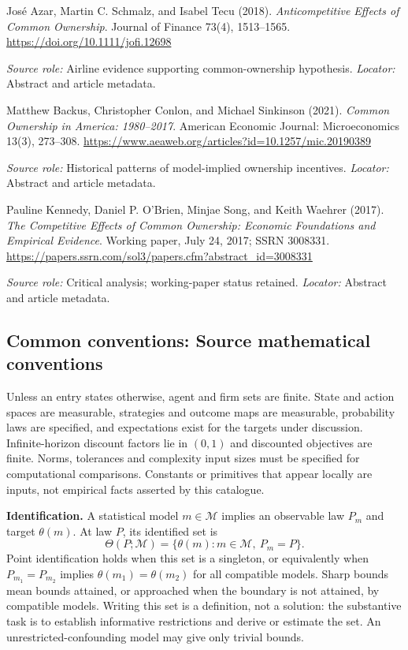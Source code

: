\documentclass[11pt,a4paper]{article}
\begin{document}
\begin{enumerate}[label={[S\arabic*]},leftmargin=*]

\item José Azar, Martin C. Schmalz, and Isabel Tecu (2018). \emph{Anticompetitive Effects of Common Ownership}. Journal of Finance 73(4), 1513--1565. \url{https://doi.org/10.1111/jofi.12698}\par \textit{Source role:} Airline evidence supporting common-ownership hypothesis. \textit{Locator:} Abstract and article metadata.

\item Matthew Backus, Christopher Conlon, and Michael Sinkinson (2021). \emph{Common Ownership in America: 1980--2017}. American Economic Journal: Microeconomics 13(3), 273--308. \url{https://www.aeaweb.org/articles?id=10.1257/mic.20190389}\par \textit{Source role:} Historical patterns of model-implied ownership incentives. \textit{Locator:} Abstract and article metadata.

\item Pauline Kennedy, Daniel P. O'Brien, Minjae Song, and Keith Waehrer (2017). \emph{The Competitive Effects of Common Ownership: Economic Foundations and Empirical Evidence}. Working paper, July 24, 2017; SSRN 3008331. \url{https://papers.ssrn.com/sol3/papers.cfm?abstract_id=3008331}\par \textit{Source role:} Critical analysis; working-paper status retained. \textit{Locator:} Abstract and article metadata.

\end{enumerate}

\subsection*{Common conventions: Source mathematical conventions}

Unless an entry states otherwise, agent and firm sets are finite. State and action spaces are measurable, strategies and outcome maps are measurable, probability laws are specified, and expectations exist for the targets under discussion. Infinite-horizon discount factors lie in $(0,1)$ and discounted objectives are finite. Norms, tolerances and complexity input sizes must be specified for computational comparisons. Constants or primitives that appear locally are inputs, not empirical facts asserted by this catalogue.

\textbf{Identification.} A statistical model $m\in\mathcal M$ implies an observable law $P_m$ and target $\theta(m)$. At law $P$, its identified set is
\[
\Theta(P;\mathcal M)=\{\theta(m):m\in\mathcal M,\ P_m=P\}.
\]
Point identification holds when this set is a singleton, or equivalently when $P_{m_1}=P_{m_2}$ implies $\theta(m_1)=\theta(m_2)$ for all compatible models. Sharp bounds mean bounds attained, or approached when the boundary is not attained, by compatible models. Writing this set is a definition, not a solution: the substantive task is to establish informative restrictions and derive or estimate the set. An unrestricted-confounding model may give only trivial bounds.
\end{document}
